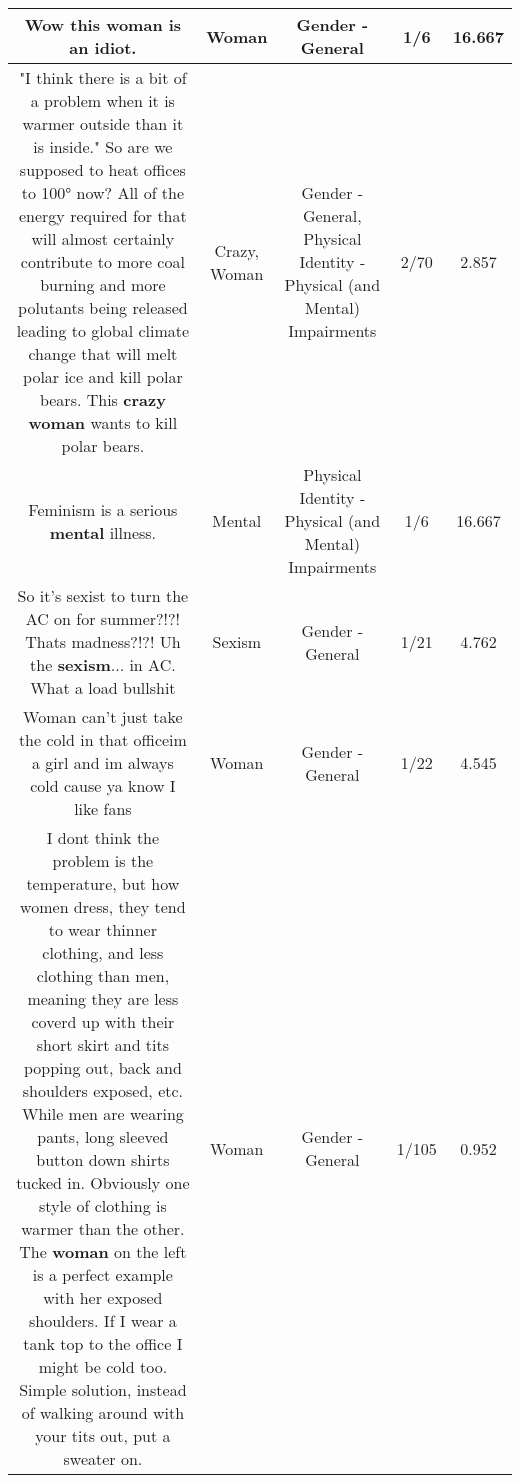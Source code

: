 \documentclass[11pt]{article}
\newlength\mylength
\begin{document}
\begin{center}
\begin{longtable}{|C{.65\mylength}|C{.30\mylength}|C{.12\mylength}|C{.12\mylength}|C{.12\mylength}|}
  \small Wow this \textbf{woman} is an idiot.\normalsize   & Woman & Gender - General & 1/6 & 16.667 \\  \hline
  \small "I think there is a bit of a problem when it is warmer outside than it is inside." So are we supposed to heat offices to 100° now? All of the energy required for that will almost certainly contribute to more coal burning and more polutants being released leading to global climate change that will melt polar ice and kill polar bears.  This \textbf{crazy} \textbf{woman} wants to kill polar bears.\normalsize   & Crazy, Woman & Gender - General, Physical Identity - Physical (and Mental) Impairments & 2/70 & 2.857 \\  \hline
  \small Feminism is a serious \textbf{mental} illness.\normalsize   & Mental & Physical Identity - Physical (and Mental) Impairments & 1/6 & 16.667 \\  \hline
  \small So it's sexist to turn the AC on for summer?!?! Thats madness?!?! Uh the \textbf{sexism}... in AC. What a load bullshit\normalsize   & Sexism & Gender - General & 1/21 & 4.762 \\  \hline
  \small Woman can't just take the cold in that officeim a girl and im always cold cause ya know I like fans\normalsize   & Woman & Gender - General & 1/22 & 4.545 \\  \hline
  \small I dont think the problem is the temperature, but how women dress, they tend to wear thinner clothing, and less clothing than men, meaning they are less coverd up with their short skirt and tits popping out, back and shoulders exposed, etc. While men are wearing pants, long sleeved button down shirts tucked in. Obviously one style of clothing is warmer than the other. The \textbf{woman} on the left is a perfect example with her exposed shoulders. If I wear a tank top to the office I might be cold too. Simple solution, instead of walking around with your tits out, put a sweater on.\normalsize   & Woman & Gender - General & 1/105 & 0.952 \\  \hline

\end{longtable}
\end{center}
\end{document}
